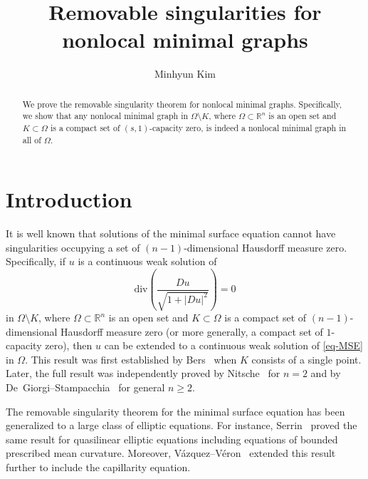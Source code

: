 \documentclass{amsart}
\title{Removable singularities for nonlocal minimal graphs}
\author{Minhyun Kim}
\theoremstyle{plain}
\theoremstyle{definition}
\numberwithin{equation}{section}
\begin{document}
\begin{abstract}
We prove the removable singularity theorem for nonlocal minimal graphs. Specifically, we show that any nonlocal minimal graph in $\Omega \setminus K$, where $\Omega \subset \mathbb{R}^n$ is an open set and $K \subset \Omega$ is a compact set of $(s, 1)$-capacity zero, is indeed a nonlocal minimal graph in all of $\Omega$.
\end{abstract}

\maketitle

\section{Introduction}

It is well known that solutions of the minimal surface equation cannot have singularities occupying a set of $(n-1)$-dimensional Hausdorff measure zero. Specifically, if $u$ is a continuous weak solution of
\begin{equation}\label{eq-MSE}
\mathrm{div}\left( \frac{Du}{\sqrt{1+|Du|^2}} \right) = 0
\end{equation}
in $\Omega \setminus K$, where $\Omega \subset \mathbb{R}^n$ is an open set and $K \subset \Omega$ is a compact set of $(n-1)$-dimensional Hausdorff measure zero (or more generally, a compact set of $1$-capacity zero), then $u$ can be extended to a continuous weak solution of \eqref{eq-MSE} in $\Omega$. This result was first established by Bers~\cite{Ber51} when $K$ consists of a single point. Later, the full result was independently proved by Nitsche~\cite{Nit65} for $n=2$ and by De~Giorgi--Stampacchia~\cite{DGS65} for general $n \geq 2$.

The removable singularity theorem for the minimal surface equation has been generalized to a large class of elliptic equations. For instance, Serrin~\cite{Ser64,Ser65} proved the same result for quasilinear elliptic equations including equations of bounded prescribed mean curvature. Moreover, V\'azquez--V\'eron~\cite{VV81} extended this result further to include the capillarity equation.
\end{document}
